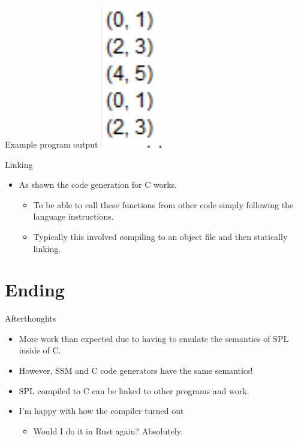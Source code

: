 \documentclass[10pt]{beamer}
\begin{document}
\begin{frame}{Example program output}
\includegraphics[width=0.2\textwidth]{presentation4/9.png}
\end{frame}

\begin{frame}{Linking}
    \begin{itemize}
        \item As shown the code generation for C works.
        \begin{itemize}
            \item To be able to call these functions from other code simply following the language instructions.
            \item Typically this involved compiling to an object file and then statically linking.
        \end{itemize}
    \end{itemize}
\end{frame}

\section{Ending}
\begin{frame}{Afterthoughts}
    \begin{itemize}
        \item More work than expected due to having to emulate the semantics of SPL inside of C.
        \item However, SSM and C code generators have the same semantics!
        \item SPL compiled to C can be linked to other programs and work.
        \item I'm happy with how the compiler turned out
        \begin{itemize}
            \item Would I do it in Rust again? Absolutely.
        \end{itemize}
    \end{itemize}
\end{frame}
\end{document}
